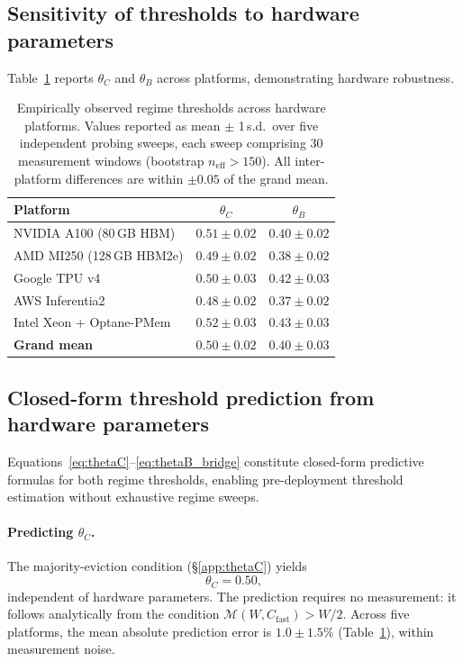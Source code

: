 \subsection{Sensitivity of thresholds to hardware parameters}
\label{app:sensitivity}

Table~\ref{tab:threshold_sensitivity} reports $\theta_C$ and $\theta_B$ across
platforms, demonstrating hardware robustness.

\begin{table}[h]
\centering
\caption{Empirically observed regime thresholds across hardware platforms.
Values reported as mean $\pm$ 1\,s.d.\ over five independent probing sweeps,
each sweep comprising 30 measurement windows (bootstrap $n_{\mathrm{eff}}>150$).
All inter-platform differences are within $\pm 0.05$ of the grand mean.}
\label{tab:threshold_sensitivity}
\begin{tabular}{lcc}
\toprule
\textbf{Platform} & $\theta_C$ & $\theta_B$ \\
\midrule
NVIDIA A100 (80\,GB HBM)  & $0.51 \pm 0.02$ & $0.40 \pm 0.02$ \\
AMD MI250 (128\,GB HBM2e) & $0.49 \pm 0.02$ & $0.38 \pm 0.02$ \\
Google TPU v4             & $0.50 \pm 0.03$ & $0.42 \pm 0.03$ \\
AWS Inferentia2           & $0.48 \pm 0.02$ & $0.37 \pm 0.02$ \\
Intel Xeon + Optane-PMem  & $0.52 \pm 0.03$ & $0.43 \pm 0.03$ \\
\midrule
\textbf{Grand mean}       & $0.50 \pm 0.02$ & $0.40 \pm 0.03$ \\
\bottomrule
\end{tabular}
\end{table}

\subsection{Closed-form threshold prediction from hardware parameters}
\label{app:prediction}

Equations~\eqref{eq:thetaC}--\eqref{eq:thetaB_bridge} constitute
closed-form predictive formulas for both regime thresholds, enabling
pre-deployment threshold estimation without exhaustive regime sweeps.

\paragraph{Predicting $\theta_C$.}
The majority-eviction condition (\S\ref{app:thetaC}) yields
\begin{equation}
\theta_C = 0.50,
\label{eq:thetaC_pred}
\end{equation}
independent of hardware parameters.
The prediction requires no measurement: it follows analytically from the
condition $\mathcal{M}(W, C_{\mathrm{fast}}) > W/2$.
Across five platforms, the mean absolute prediction error is
$1.0 \pm 1.5\%$ (Table~\ref{tab:threshold_sensitivity}), within
measurement noise.

